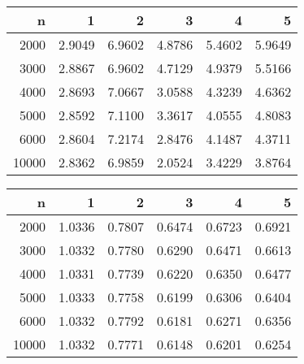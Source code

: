 \begin{table}[ht]
\centering
\begin{tabular}{rrrrrr}
  \hline
n & 1 & 2 & 3 & 4 & 5 \\ 
  \hline
2000 & 2.9049 & 6.9602 & 4.8786 & 5.4602 & 5.9649 \\ 
  3000 & 2.8867 & 6.9602 & 4.7129 & 4.9379 & 5.5166 \\ 
  4000 & 2.8693 & 7.0667 & 3.0588 & 4.3239 & 4.6362 \\ 
  5000 & 2.8592 & 7.1100 & 3.3617 & 4.0555 & 4.8083 \\ 
  6000 & 2.8604 & 7.2174 & 2.8476 & 4.1487 & 4.3711 \\ 
  10000 & 2.8362 & 6.9859 & 2.0524 & 3.4229 & 3.8764 \\ 
   \hline
\end{tabular}
\end{table}
\begin{table}[ht]
\centering
\begin{tabular}{rrrrrr}
  \hline
n & 1 & 2 & 3 & 4 & 5 \\ 
  \hline
2000 & 1.0336 & 0.7807 & 0.6474 & 0.6723 & 0.6921 \\ 
  3000 & 1.0332 & 0.7780 & 0.6290 & 0.6471 & 0.6613 \\ 
  4000 & 1.0331 & 0.7739 & 0.6220 & 0.6350 & 0.6477 \\ 
  5000 & 1.0333 & 0.7758 & 0.6199 & 0.6306 & 0.6404 \\ 
  6000 & 1.0332 & 0.7792 & 0.6181 & 0.6271 & 0.6356 \\ 
  10000 & 1.0332 & 0.7771 & 0.6148 & 0.6201 & 0.6254 \\ 
   \hline
\end{tabular}
\end{table}
